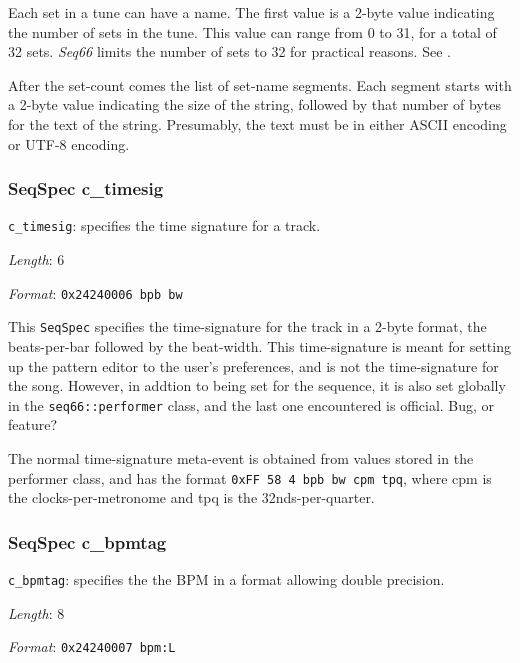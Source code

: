    Each set in a tune can have a name.  The first value is a 2-byte value
   indicating the number of sets in the tune.  This value can range from
   0 to 31, for a total of 32 sets.
   \textsl{Seq66} limits the number of sets to 32 for practical reasons.
   See .

   After the set-count comes the list of set-name segments.  Each segment
   starts with a 2-byte value indicating the size of the string, followed
   by that number of bytes for the text of the string.  Presumably, the
   text must be in either ASCII encoding or UTF-8 encoding.

\subsubsection{SeqSpec c\_timesig}
\label{subsubsec:midi_format_track_seqspec_timesig}

   \begin{description}
      \item \texttt{c\_timesig}: specifies the time signature for a track.
      \item \textsl{Length}: 6
      \item \textsl{Format}: \texttt{0x24240006 bpb bw}
   \end{description}

   This \texttt{SeqSpec} specifies the time-signature for the track in a 2-byte
   format, the beats-per-bar followed by the beat-width.
   This time-signature is meant for setting up the pattern editor to the
   user's preferences, and is not the time-signature for the song.
   However, in addtion to being set for the sequence, it is also
   set globally in the \texttt{seq66::performer} class, and the last one
   encountered is official.
   Bug, or feature?

   The normal time-signature meta-event is obtained from values stored in
   the performer class, and has the format
   \texttt{0xFF 58 4 bpb bw cpm tpq}, where cpm is the clocks-per-metronome
   and tpq is the 32nds-per-quarter.

\subsubsection{SeqSpec c\_bpmtag}
\label{subsubsec:midi_format_track_seqspec_bpmtag}

   \begin{description}
      \item \texttt{c\_bpmtag}: specifies the the BPM in a format allowing double
         precision.
      \item \textsl{Length}: 8
      \item \textsl{Format}: \texttt{0x24240007 bpm:L}
   \end{description}

